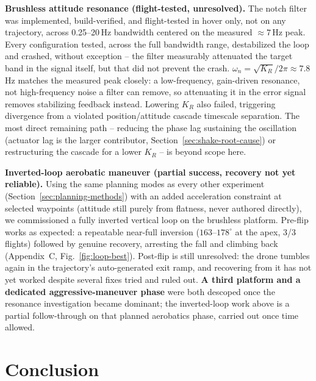 \documentclass[11pt,a4paper]{article}
\begin{document}
\textbf{Brushless attitude resonance (flight-tested, unresolved).} The notch filter was
implemented, build-verified, and flight-tested in hover only, not on any trajectory, across
0.25--20\,Hz bandwidth centered on the measured $\approx7$\,Hz peak. Every configuration tested,
across the full bandwidth range, destabilized the loop and crashed, without exception -- the
filter measurably attenuated the target band in the signal itself, but that did not prevent the
crash. $\omega_n=\sqrt{K_R}/2\pi\approx7.8$\,Hz matches the
measured peak closely: a low-frequency, gain-driven resonance, not high-frequency noise a filter
can remove, so attenuating it in the error signal removes stabilizing feedback instead. Lowering
$K_R$ also failed, triggering divergence from a violated position/attitude cascade timescale
separation. The most direct remaining path -- reducing the phase lag sustaining the oscillation
(actuator lag is the larger contributor, Section~\ref{sec:shake-root-cause}) or restructuring the
cascade for a lower $K_R$ -- is beyond scope here.

\textbf{Inverted-loop aerobatic maneuver (partial success, recovery not yet reliable).} Using the same planning
modes as every other experiment (Section~\ref{sec:planning-methods}) with an added acceleration
constraint at selected waypoints (attitude still purely from flatness, never authored directly),
we commissioned a fully inverted vertical loop on the brushless platform. Pre-flip works as
expected: a repeatable near-full inversion ($163$--$178^\circ$
at the apex, 3/3 flights) followed by genuine recovery, arresting the fall and climbing back
(Appendix~C, Fig.~\ref{fig:loop-best}). Post-flip is still unresolved: the drone tumbles again in
the trajectory's auto-generated exit ramp, and recovering from it has not yet worked despite
several fixes tried and ruled out. \textbf{A third platform and a dedicated aggressive-maneuver
phase} were both descoped once the
resonance investigation became dominant; the inverted-loop work above is a partial follow-through
on that planned aerobatics phase, carried out once time allowed.

\section{Conclusion}
\end{document}
